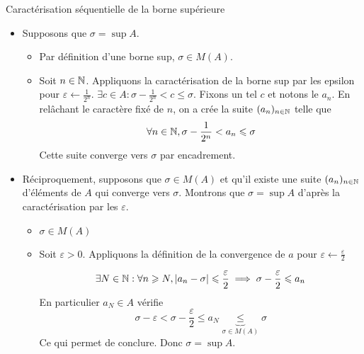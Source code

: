 \documentclass{article}
\renewenvironment{question_kholle}[2][ ]
{
	\subsection{\texorpdfstring{#2}{}}
	\notblank{#1}
	{
		\noindent #1
		\bigbreak
	}
	{}
	\begin{proof}
}
{
	\end{proof}
}
\begin{document}
\begin{question_kholle}[{Soit $A \in \mathcal{P}(\R)$ non vide et majorée. Soit $\sigma \in \R$
				$$
					\sigma = \sup A \iff \left\{ \begin{array}{ll}
						\sigma \in M(A) \\
						\exists (a_{n})_{n \in \N} \in A^{\N} : \lim_{n \to +\infty} a_n = \sigma
					\end{array}\right.
				$$
			}]{Caractérisation séquentielle de la borne supérieure}
	\hfill\\
	\begin{itemize}[label=$\star$]
		\item Supposons que $\sigma = \sup A$.
		      \begin{itemize}[label=$\bullet$]
			      \item Par définition d'une borne sup, $\sigma \in M(A)$.
			      \item Soit $n \in \mathbb N$. Appliquons la caractérisation de la borne sup par les epsilon pour $\varepsilon \leftarrow \frac{1}{2^{n}}$.
			            $\exists c \in A : \sigma - \frac{1}{2^{n}} < c \leqslant \sigma$.
			            Fixons un tel $c$ et notons le $a_{n}$. En relâchant le caractère fixé de $n$, on a crée la suite $(a_{n})_{n \in \mathbb N}$ telle que
			            $$
				            \forall n \in \mathbb N, \sigma - \frac{1}{2^{n}} < a_{n}\leqslant \sigma
			            $$
			            Cette suite converge vers $\sigma$ par encadrement.
		      \end{itemize}
		\item Réciproquement, supposons que $\sigma \in M(A)$ et qu'il existe une suite $(a_{n})_{n \in \mathbb N}$ d'éléments de $A$ qui converge vers $\sigma$. Montrons que $\sigma = \sup A$ d'après la caractérisation par les $\varepsilon$.
		      \begin{itemize}[label=$\bullet$]
			      \item$\sigma \in M(A)$
			      \item Soit $\varepsilon>0$. Appliquons la définition de la convergence de $a$ pour $\varepsilon \leftarrow \frac{\varepsilon}{2}$

			            $$
				            \exists N \in \mathbb N : \forall n \geqslant N, \lvert a_{n} - \sigma \rvert  \leqslant \frac{\varepsilon}{2} \implies \sigma - \frac{\varepsilon}{2}\leqslant a_{n}
			            $$
			            En particulier $a_{N} \in A$ vérifie
			            $$
				            \sigma - \varepsilon < \sigma - \frac{\varepsilon}{2} \leqslant a_{N} \underbrace{ \leqslant }_{ \sigma \in M(A) } \sigma
			            $$
			            Ce qui permet de conclure.
			            Donc $\sigma = \sup A$.
		      \end{itemize}
	\end{itemize}
\end{question_kholle}
\end{document}
